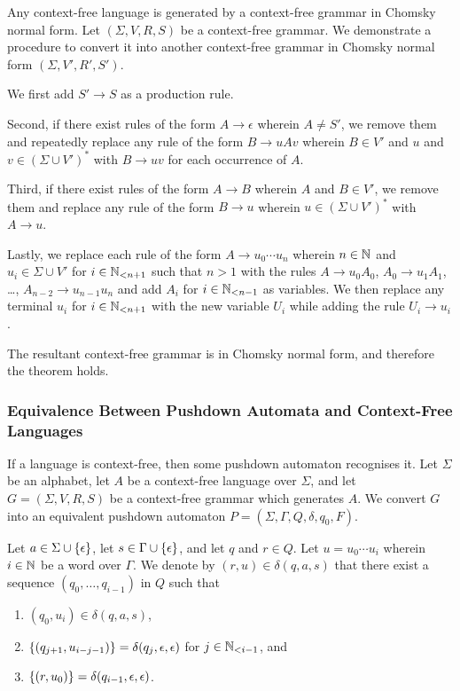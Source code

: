 \Bth
    Any context-free language is generated by a context-free grammar in Chomsky
    normal form.
\Eth
\Bpr
    Let \((\Sigma, V, R, S)\) be a context-free grammar. We demonstrate a
    procedure to convert it into another context-free grammar in Chomsky normal
    form \((\Sigma, V', R', S')\).

    We first add \(S' \to S\) as a production rule.

    Second, if there exist rules of the form \(A \to \epsilon\) wherein \(A \neq
    S'\), we remove them and repeatedly replace any rule of the form \(B \to u A
    v\) wherein \(B \in V'\) and \(u\) and \(v \in (\Sigma \cup V')^*\) with \(B
    \to u v\) for each occurrence of \(A\).

    Third, if there exist rules of the form \(A \to B\) wherein \(A\) and \(B
    \in V'\), we remove them and replace any rule of the form \(B \to u\)
    wherein \(u \in (\Sigma \cup V')^*\) with \(A \to u\).

    Lastly, we replace each rule of the form \(A \to u_0 \cdots u_n\) wherein
    \(n \in \setnat\) and \(u_i \in \Sigma \cup V'\) for \(i \in \Nln[n + 1]\)
    such that \(n > 1\) with the rules \(A \to u_0 A_0\), \(A_0 \to u_1 A_1\),
    \ldots, \(A_{n - 2} \to u_{n - 1} u_n\) and add \(A_i\) for \(i \in \Nln[n -
    1]\) as variables. We then replace any terminal \(u_i\) for \(i \in \Nln[n +
    1]\) with the new variable \(U_i\) while adding the rule \(U_i \to u_i\).

    The resultant context-free grammar is in Chomsky normal form, and therefore
    the theorem holds.
\Epr

\subsubsection{Equivalence Between Pushdown Automata and Context-Free Languages}

\Blm
    \label{lem3}
    If a language is context-free, then some pushdown automaton recognises it.
\Elm
\Bpr
    Let \(\Sigma\) be an alphabet, let \(A\) be a context-free language over
    \(\Sigma\), and let \(G = (\Sigma, V, R, S)\) be a context-free grammar
    which generates \(A\).  We convert \(G\) into an equivalent pushdown
    automaton \(P = (\Sigma, \Gamma, Q, \delta, q_0, F)\).

    Let \(a \in \Sigma \cup \set{\epsilon}\), let \(s \in \Gamma \cup
    \set{\epsilon}\), and let \(q\) and \(r \in Q\). Let \(u = u_0 \cdots u_i\)
    wherein \(i \in \setnat\) be a word over \(\Gamma\). We denote by \((r, u)
    \in \delta(q, a, s)\) that there exist a sequence \((q_0, \ldots, q_{i -
    1})\) in \(Q\) such that
    \begin{enumerate}
        \item \((q_0, u_i) \in \delta(q, a, s)\),
        \item \(\set{(q_{j + 1}, u_{i - j - 1})} = \delta(q_j, \epsilon,
        \epsilon)\) for \(j \in \Nln[i - 1]\), and
        \item \(\set{(r, u_0)} = \delta(q_{i - 1}, \epsilon, \epsilon)\).
    \end{enumerate}

